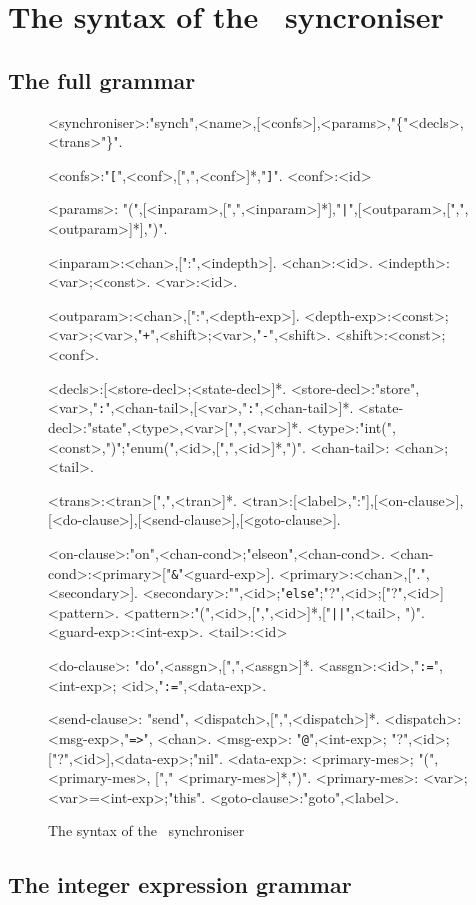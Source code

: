 \chapter{The syntax of the \ak\ syncroniser}

  \section{The full grammar\label{sync_syntax}}
\begin{figure}[h!]
\begin{framed}
\small
\begin{grammar}
<synchroniser>:"synch",<name>,[<confs>],<params>,"\{"<decls>,<trans>"\}".

<confs>:"{\tt [}",<conf>,[",",<conf>]*,"{\tt ]}".
<conf>:<id>

<params>: "(",[<inparam>,[",",<inparam>]*],"{\tt |}",[<outparam>,[",",<outparam>]*],")".

<inparam>:<chan>,[":",<indepth>].
<chan>:<id>.
<indepth>:<var>;<const>.
<var>:<id>.

<outparam>:<chan>,[":",<depth-exp>].
<depth-exp>:<const>;<var>;<var>,"{\tt+}",<shift>;<var>,"{\tt -}",<shift>.
<shift>:<const>;<conf>.

<decls>:[<store-decl>;<state-decl>]*.
<store-decl>:"store",<var>,"{\tt :}",<chan-tail>,[<var>,"{\tt :}",<chan-tail>]*.
<state-decl>:"state",<type>,<var>[",",<var>]*.
<type>:"int(",<const>,")";"enum(",<id>,[",",<id>]*,")".
<chan-tail>: <chan>;<tail>.

<trans>:<tran>[",",<tran>]*.
<tran>:[<label>,":"],[<on-clause>],[<do-clause>],[<send-clause>],[<goto-clause>].

<on-clause>:"on",<chan-cond>;"elseon",<chan-cond>.
<chan-cond>:<primary>["{\tt \&}"<guard-exp>].
<primary>:<chan>,[".",<secondary>].
<secondary>:"{\tt@}",<id>;"{\tt else}";"?",<id>;["?",<id>]<pattern>.
<pattern>:"(",<id>,[",",<id>]*,["{\tt||}",<tail>, ")".
<guard-exp>:<int-exp>.
<tail>:<id>

<do-clause>: "do",<assgn>,[",",<assgn>]*.
<assgn>:<id>,"{\tt :=}",<int-exp>; <id>,"{\tt :=}",<data-exp>.

<send-clause>: "send", <dispatch>,[",",<dispatch>]*.
<dispatch>: <msg-exp>,"{\tt =>}", <chan>.
<msg-exp>: "{\tt @}",<int-exp>; "?",<id>; ["?",<id>],<data-exp>;"nil".
<data-exp>: <primary-mes>; "(",<primary-mes>, ["," <primary-mes>]*,")".
<primary-mes>: <var>;<var>=<int-exp>;"this".
<goto-clause>:"goto",<label>.

\end{grammar}
\end{framed}
\caption{The syntax of the \ak\ synchroniser}
\end{figure}

  \section{The integer expression grammar\label{int_exp_gr}}
